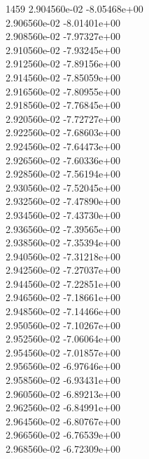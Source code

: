 1459	2.904560e-02	-8.05468e+00	\\ 	2.906560e-02	-8.01401e+00	\\ 	2.908560e-02	-7.97327e+00	\\ 	2.910560e-02	-7.93245e+00	\\ 	2.912560e-02	-7.89156e+00	\\ 	2.914560e-02	-7.85059e+00	\\ 	2.916560e-02	-7.80955e+00	\\ 	2.918560e-02	-7.76845e+00	\\ 	2.920560e-02	-7.72727e+00	\\ 	2.922560e-02	-7.68603e+00	\\ 	2.924560e-02	-7.64473e+00	\\ 	2.926560e-02	-7.60336e+00	\\ 	2.928560e-02	-7.56194e+00	\\ 	2.930560e-02	-7.52045e+00	\\ 	2.932560e-02	-7.47890e+00	\\ 	2.934560e-02	-7.43730e+00	\\ 	2.936560e-02	-7.39565e+00	\\ 	2.938560e-02	-7.35394e+00	\\ 	2.940560e-02	-7.31218e+00	\\ 	2.942560e-02	-7.27037e+00	\\ 	2.944560e-02	-7.22851e+00	\\ 	2.946560e-02	-7.18661e+00	\\ 	2.948560e-02	-7.14466e+00	\\ 	2.950560e-02	-7.10267e+00	\\ 	2.952560e-02	-7.06064e+00	\\ 	2.954560e-02	-7.01857e+00	\\ 	2.956560e-02	-6.97646e+00	\\ 	2.958560e-02	-6.93431e+00	\\ 	2.960560e-02	-6.89213e+00	\\ 	2.962560e-02	-6.84991e+00	\\ 	2.964560e-02	-6.80767e+00	\\ 	2.966560e-02	-6.76539e+00	\\ 	2.968560e-02	-6.72309e+00	\\ \hline
